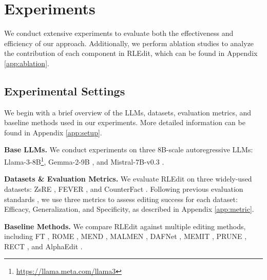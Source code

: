 \section{Experiments}
\label{section:4}

We conduct extensive experiments to evaluate both the effectiveness and efficiency of our approach. Additionally, we perform ablation studies to analyze the contribution of each component in RLEdit, which can be found in Appendix \ref{app:ablation}.

\subsection{Experimental Settings}
We begin with a brief overview of the LLMs, datasets, evaluation metrics, and baseline methods used in our experiments. More detailed information can be found in Appendix \ref{app:setup}.

\textbf{Base LLMs.} We conduct experiments on three 8B-scale autoregressive LLMs: Llama-3-8B\footnote{\href{https://llama.meta.com/llama3}{https://llama.meta.com/llama3}}, Gemma-2-9B \cite{gemma2}, and Mistral-7B-v0.3 \cite{mistral7b}.

\textbf{Datasets \& Evaluation Metrics.} We evaluate RLEdit on three widely-used datasets: ZsRE \cite{zsre}, FEVER \cite{fever}, and CounterFact \cite{rome}. Following previous evaluation standards \cite{mend, rome, memit}, we use three metrics to assess editing success for each dataset: Efficacy, Generalization, and Specificity, as described in Appendix \ref{app:metric}.

\textbf{Baseline Methods.} We compare RLEdit against multiple editing methods, including FT \cite{modifying}, ROME \cite{rome}, MEND \cite{mend}, MALMEN \cite{malmen}, DAFNet \cite{dafnet}, MEMIT \cite{memit}, PRUNE \cite{prune}, RECT \cite{rect}, and AlphaEdit \cite{alphaedit}.


